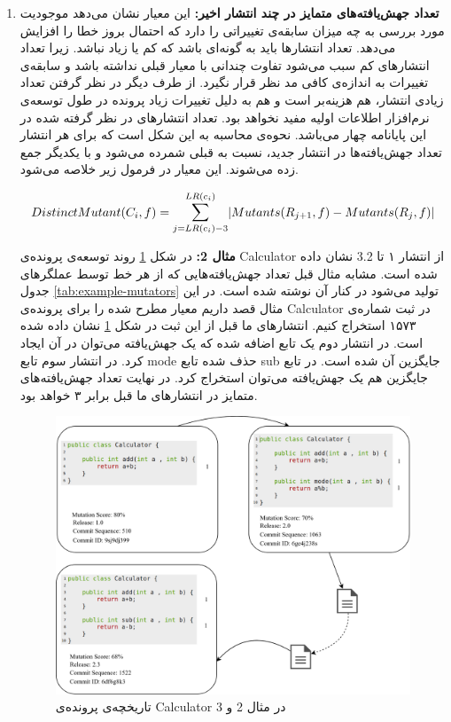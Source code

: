 \begin{enumerate}
\item 
\textbf{
		تعداد جهش‌یافته‌های متمایز در چند انتشار اخیر:} این معیار نشان می‌دهد موجودیت مورد بررسی به چه میزان سابقه‌ی تغییراتی را دارد که احتمال بروز خطا را افزایش می‌دهد. تعداد انتشارها باید به گونه‌ای باشد که کم یا زیاد نباشد. زیرا تعداد انتشارهای کم سبب می‌شود تفاوت چندانی با معیار قبلی نداشته باشد و سابقه‌ی تغییرات به اندازه‌ی کافی مد نظر قرار نگیرد. از طرف دیگر در نظر گرفتن تعداد زیادی انتشار، هم هزینه‌بر است و هم به دلیل تغییرات زیاد  پرونده در طول توسعه‌ی نرم‌افزار اطلاعات اولیه مفید نخواهد بود.  تعداد انتشارهای  در نظر گرفته شده در این پایانامه چهار می‌باشد. نحوه‌ی محاسبه به این شکل است که برای هر انتشار تعداد جهش‌یافته‌ها در انتشار جدید، نسبت به قبلی  شمرده می‌شود و با یکدیگر جمع زده  می‌شوند. این معیار در فرمول زیر خلاصه می‌شود. 
	

\begin{latin}
\[ 	
DistinctMutant(C_i,f) = \mathlarger{\sum}\limits_{j=LR(c_i)-3}^{LR(c_i)} 
| Mutants(R_{j+1},f) - Mutants(R_j,f)|
\]
\end{latin}

	
\textbf{مثال 2:}
در شکل \ref{fig:example2} روند توسعه‌ی پرونده‌ی  Calculator از انتشار ۱ تا  3.2 نشان داده شده است. مشابه مثال قبل تعداد جهش‌یافته‌هایی که از هر خط توسط عملگرهای جدول \ref{tab:example-mutators}  تولید می‌شود در کنار آن نوشته شده است. در این مثال قصد داریم معیار مطرح شده را برای پرونده‌ی Calculator‌ در ثبت  شماره‌ی ۱۵۷۳ استخراج کنیم. انتشارهای‌ ما قبل از این ثبت در شکل  \ref{fig:example2} نشان داده شده است. در انتشار دوم یک تابع اضافه شده که یک جهش‌یافته می‌توان در آن ایجاد کرد. در انتشار سوم تابع mode حذف شده  تابع sub جایگزین آن شده است. در تابع جایگزین هم یک جهش‌یافته می‌توان استخراج کرد. در نهایت تعداد جهش‌یافته‌های متمایز در انتشارهای ما قبل برابر ۳ خواهد بود. 


\begin{figure}[H]
	\centering
	\includegraphics[width=1\textwidth]{img/method/example2.png}
	\caption{ تاریخچه‌ی پرونده‌ی Calculator در مثال 2 و 3}
	\label{fig:example2}
\end{figure}


\end{enumerate}
